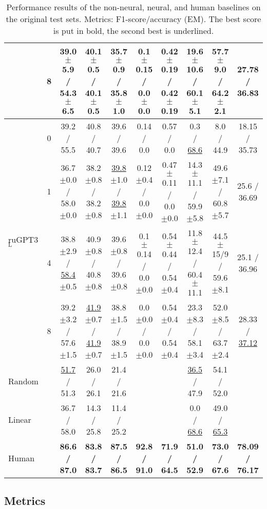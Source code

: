\documentclass[11pt]{article}
\newcommand{\xmark}{\ding{55}}\newcommand{\cmark}{\ding{51}}
\begin{document}
\begin{table*}[!ht]
{\begin{tabular}{lccccccccc}
        & 8 & 39.0 {\tiny$\pm$5.9} / 54.3 {\tiny$\pm$6.5} & 40.1 {\tiny$\pm$0.5} / 40.1 {\tiny$\pm$0.5} & 35.7 {\tiny$\pm$0.9} / 35.8 {\tiny$\pm$1.0} & 0.1 {\tiny$\pm$0.15} / 0.0 {\tiny$\pm$0.0} & 0.42 {\tiny$\pm$0.19} / 0.42 {\tiny$\pm$0.19} & 19.6 {\tiny$\pm$10.6} / 60.1 {\tiny$\pm$5.1} & 57.7 {\tiny$\pm$9.0} / 64.2 {\tiny$\pm$2.1} & 27.78 / 36.83 \\
    \midrule
    \multirow{4}{*}{ruGPT3$_\text{L}$} 
        & 0 & 39.2 / 55.5 & 40.8 / 40.7 & 39.6 / 39.6 & 0.14 / 0.0 & 0.57 / 0.0 & 0.3 / \underline{68.6} & 8.0 / 44.9 & 18.15 / 35.73 \\
        & 1 & 36.7 {\tiny$\pm$0.0} / 58.0 {\tiny$\pm$0.0} & 38.2 {\tiny$\pm$0.8} / 38.2 {\tiny$\pm$0.8} & \underline{39.8} {\tiny$\pm$1.0} / \underline{39.8} {\tiny$\pm$1.1} & 0.12 {\tiny$\pm$0.4} / 0.0 {\tiny$\pm$0.0} & 0.47 {\tiny$\pm$0.11} / 0.0 {\tiny$\pm$0.0} & 14.3 {\tiny$\pm$11.1} / 59.9 {\tiny$\pm$5.8} & 49.6 {\tiny$\pm$7.1} / 60.8 {\tiny$\pm$5.7} & 25.6 / 36.69\\
        & 4 & 38.8 {\tiny$\pm$2.9} / \underline{58.4} {\tiny$\pm$0.5} & 40.9 {\tiny$\pm$0.8} / 40.8 {\tiny$\pm$0.8} & 39.6 {\tiny$\pm$0.8} / 39.6 {\tiny$\pm$0.8} & 0.1 {\tiny$\pm$0.14} / 0.0 {\tiny$\pm$0.0} & 0.54 {\tiny$\pm$0.44} / 0.54 {\tiny$\pm$0.4} & 11.8 {\tiny$\pm$12.4} / 60.4 {\tiny$\pm$11.1} & 44.5 {\tiny$\pm$15/9} / 59.6 {\tiny$\pm$8.1} & 25.1 / 36.96\\
        & 8 & 39.2 {\tiny$\pm$3.2} / 57.6 {\tiny$\pm$1.5} & \underline{41.9} {\tiny$\pm$0.7} / \underline{41.9} {\tiny$\pm$0.7} & 38.8 {\tiny$\pm$1.5} / 38.9 {\tiny$\pm$1.5} & 0.0 {\tiny$\pm$0.0} / 0.0 {\tiny$\pm$0.0} & 0.54 {\tiny$\pm$0.4} / 0.54 {\tiny$\pm$0.4} & 23.3 {\tiny$\pm$8.3} / 58.1 {\tiny$\pm$3.4} & 52.0 {\tiny$\pm$8.5} / 63.7 {\tiny$\pm$2.4} & 28.33 / \underline{37.12} \\
    \midrule
    Random 
        & \xmark & \underline{51.7} / 51.3 & 26.0 / 26.1 & 21.4 / 21.6 & \xmark & \xmark & \underline{36.5} / 47.9 & 54.1 / 52.0 & \xmark \\ Linear
        & \xmark & 36.7 / 58.0 & 14.3 / 25.8 & 11.4 / 25.2 & \xmark & \xmark & 0.0 / \underline{68.6}  & 49.0 / \underline{65.3} & \xmark \\ Human 
        & \xmark & \bf 86.6 / 87.0 & \bf 83.8 / 83.7 & \bf 87.5 / 86.5 & \bf 92.8 / 91.0 &   \bf 71.9 / 64.5 & \bf 51.0 / 52.9 & \bf 73.0 / 67.6 & \bf 78.09 / 76.17 \\
    \bottomrule
    \end{tabular}}
    \caption{Performance results of the non-neural, neural, and human baselines on the original test sets. Metrics: F1-score/accuracy (EM). The best score is put in bold, the second best is underlined.}
    \label{tab:eval_sets_results}
\end{table*} \subsection{Metrics} 
\end{document}
